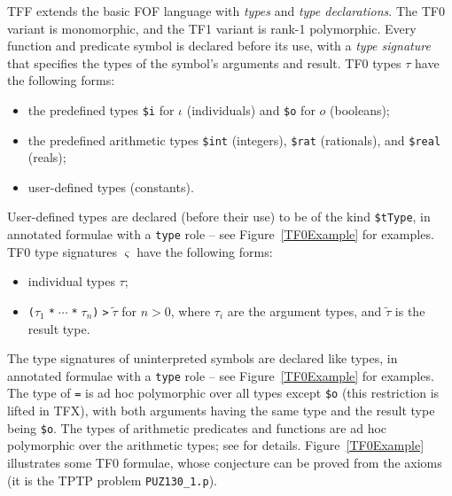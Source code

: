 \documentclass{easychair}
\begin{document}
TFF extends the basic FOF language with {\em types} and {\em type
declarations}.
The TF0 variant is monomorphic, and the TF1 variant is rank-1 polymorphic.
Every function and predicate symbol is declared before its use, with
a {\em type signature} that specifies the types of the symbol's arguments
and result.
TF0 types $\tau$ have the following forms:
\begin{itemize}
\item the predefined types {\tt \$i} for $\iota$ (individuals) and
      {\tt \$o} for $o$ (booleans);
\item the predefined arithmetic types {\tt \$int} (integers), {\tt \$rat}
      (rationals), and {\tt \$real} (reals);
\item user-defined types (constants).
\end{itemize}
User-defined types are declared (before their use) to be of the kind
{\tt \$tType}, in annotated formulae with a {\tt type} role -- see
Figure~\ref{TF0Example} for examples.
TF0 type signatures $\varsigma$ have the following forms:
\begin{itemize}
\item individual types $\tau$;
\item {\tt ($\tau_1\;$*$\;{\cdots}\;$*$\;\tau_n$)$\;$>$\;\tilde \tau$}
      for $n > 0$, where $\tau_i$ are the argument types, and $\tilde \tau$
      is the result type.
\end{itemize}
The type signatures of uninterpreted symbols are declared like types, in
annotated formulae with a {\tt type} role -- see Figure~\ref{TF0Example}
for examples.
The type of {\tt =} is ad hoc polymorphic over all types except {\tt \$o} (this
restriction is lifted in TFX), with both arguments having the same type and 
the result type being {\tt \$o}.
The types of arithmetic predicates and functions are ad hoc polymorphic
over the arithmetic types; see \cite{SS+12} for details.
Figure~\ref{TF0Example} illustrates some TF0 formulae, whose conjecture can
be proved from the axioms (it is the TPTP problem {\tt PUZ130\_1.p}).
\end{document}
